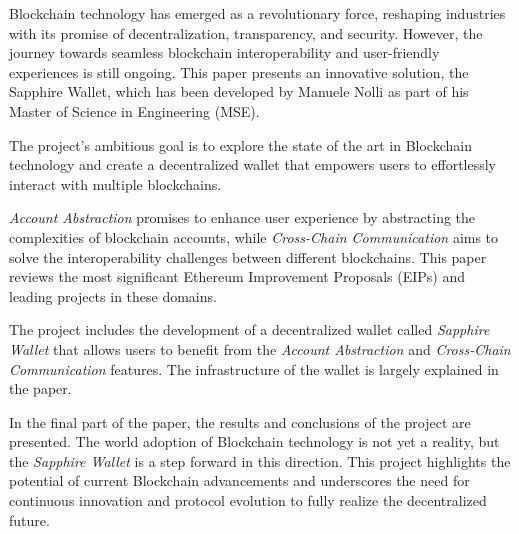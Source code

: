\label{chap:introduction}

Blockchain technology has emerged as a revolutionary force, reshaping industries with its promise of decentralization, transparency, and security. However, the journey towards seamless blockchain interoperability and user-friendly experiences is still ongoing. This paper presents an innovative solution, the Sapphire Wallet, which has been developed by Manuele Nolli as part of his Master of Science in Engineering (MSE).

The project's ambitious goal is to explore the state of the art in Blockchain technology and create a decentralized wallet that empowers users to effortlessly interact with multiple blockchains. 

\textit{Account Abstraction} promises to enhance user experience by abstracting the complexities of blockchain accounts, while \textit{Cross-Chain Communication} aims to solve the interoperability challenges between different blockchains. This paper reviews the most significant Ethereum Improvement Proposals (EIPs) and leading projects in these domains.

The project includes the development of a decentralized wallet called \textit{Sapphire Wallet} that allows users to benefit from the \textit{Account Abstraction} and \textit{Cross-Chain Communication} features. The infrastructure of the wallet is largely explained in the paper.

In the final part of the paper, the results and conclusions of the project are presented. The world adoption of Blockchain technology is not yet a reality, but the \textit{Sapphire Wallet} is a step forward in this direction. This project highlights the potential of current Blockchain advancements and underscores the need for continuous innovation and protocol evolution to fully realize the decentralized future.